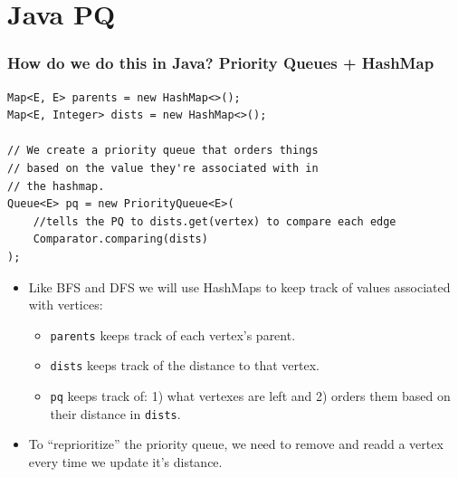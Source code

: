 \documentclass{beamer}
\begin{document}
\section{Java PQ}
\begin{frame}[fragile]
    \frametitle{How do we do this in Java? Priority Queues + HashMap}
    \begin{lstlisting}
Map<E, E> parents = new HashMap<>();
Map<E, Integer> dists = new HashMap<>();

// We create a priority queue that orders things
// based on the value they're associated with in
// the hashmap.
Queue<E> pq = new PriorityQueue<E>(
    //tells the PQ to dists.get(vertex) to compare each edge
    Comparator.comparing(dists) 
);
    \end{lstlisting}
    \begin{itemize}
        \item Like BFS and DFS we will use HashMaps to keep track of values associated with vertices:
            \begin{itemize}
                \item \lstinline|parents| keeps track of each vertex's parent.
                \item \lstinline|dists| keeps track of the distance to that vertex.
                \item \lstinline|pq| keeps track of: 1) what vertexes are left and 2) orders them based on their distance in \lstinline|dists|.
            \end{itemize}
        \item To ``reprioritize'' the priority queue, we need to remove and readd a vertex every time we update it's distance.
    \end{itemize}
\end{frame}
\end{document}
